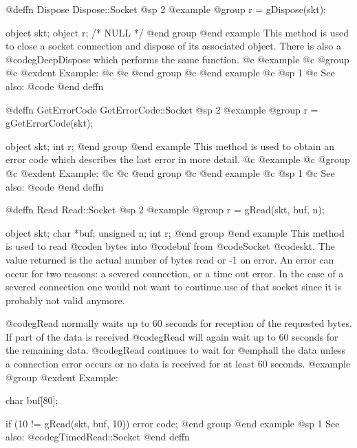 @deffn {Dispose} Dispose::Socket
@sp 2
@example
@group
r = gDispose(skt);

object  skt;
object  r;     /*  NULL  */
@end group
@end example
This method is used to close a socket connection and dispose of its
associated object.  There is also a @code{gDeepDispose} which performs the
same function.
@c @example
@c @group
@c @exdent Example:
@c 
@c @end group
@c @end example
@c @sp 1
@c See also:  @code{}
@end deffn















@deffn {GetErrorCode} GetErrorCode::Socket
@sp 2
@example
@group
r = gGetErrorCode(skt);

object  skt;
int     r;
@end group
@end example
This method is used to obtain an error code which describes the last
error in more detail.
@c @example
@c @group
@c @exdent Example:
@c 
@c @end group
@c @end example
@c @sp 1
@c See also:  @code{}
@end deffn












@deffn {Read} Read::Socket
@sp 2
@example
@group
r = gRead(skt, buf, n);

object   skt;
char     *buf;
unsigned n;
int      r;
@end group
@end example
This method is used to read @code{n} bytes into @code{buf} from
@code{Socket} @code{skt}.  The value returned is the actual number
of bytes read or -1 on error.  An error can occur for two reasons:
a severed connection, or a time out error.  In the case of a severed
connection one would not want to continue use of that socket since
it is probably not valid anymore.

@code{gRead} normally waits up to 60 seconds for reception of the
requested bytes.  If part of the data is received @code{gRead}
will again wait up to 60 seconds for the remaining data.  @code{gRead}
continues to wait for @emph{all} the data unless a connection error
occurs or no data is received for at least 60 seconds.
@example
@group
@exdent Example:
 
char    buf[80];

if (10 != gRead(skt, buf, 10))
        error code;
@end group
@end example
@sp 1
See also:  @code{gTimedRead::Socket}
@end deffn
















